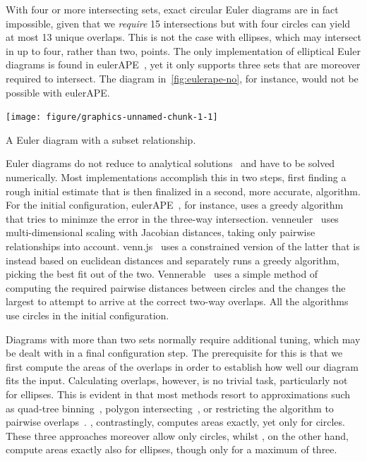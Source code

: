 \documentclass[
  oneside,
  openany,
  numbers=noendperiod,
  parskip=half,
  bibliography=totoc
]{scrbook}\usepackage[]{graphicx}\usepackage{xcolor}
\newenvironment{knitrout}{}{} %
\newcommand{\pkg}[1]{{\fontseries{b}\selectfont #1}}
\begin{document}
With four or more intersecting sets, exact circular Euler diagrams are in fact
impossible, given that we \emph{require} 15 intersections but with four circles
can yield at most 13 unique overlaps. This is not the case with ellipses, which
may intersect in up to four, rather than two, points. The only implementation of
elliptical Euler diagrams is found in \pkg{eulerAPE}~\citep{micallef_2014}, yet
it only supports three sets that are moreover required to intersect. The
diagram in~\cref{fig:eulerape-no}, for instance, would not be possible
with \pkg{eulerAPE}.

\begin{marginfigure}
\begin{knitrout}\small
{}\color{fgcolor}

{\centering \texttt{[image: figure/graphics-unnamed-chunk-1-1]} 

}



\end{knitrout}
\caption{A Euler diagram with a subset relationship.}
\label{fig:eulerape-no}
\end{marginfigure}

Euler diagrams do not reduce to analytical solutions~\citep{chow_2007} and have
to be solved numerically. Most implementations accomplish this in two steps,
first finding a rough initial estimate that is then finalized in a second, more
accurate, algorithm. For the initial configuration,
\pkg{eulerAPE}~\citep{micallef_2013}, for instance, uses a greedy algorithm that
tries to minimze the error in the three-way intersection.
\pkg{venneuler}~\citep{wilkinson_2012} uses multi-dimensional scaling with
Jacobian distances, taking only pairwise relationships into account.
\pkg{venn.js}~\citet{frederickson_2016} uses a constrained version of the latter
that is instead based on euclidean distances and separately runs a greedy
algorithm, picking the best fit out of the two.
\pkg{Vennerable}~\citet{swinton_2011} uses a simple method of computing the
required pairwise distances between circles and the changes the largest to
attempt to arrive at the correct two-way overlaps. All the algorithms use
circles in the initial configuration.

Diagrams with more than two sets normally require additional tuning, which may
be dealt with in a final configuration step. The prerequisite for this is that
we first compute the areas of the overlaps in order to establish how well our
diagram fits the input. Calculating overlaps, however, is no trivial task,
particularly not for ellipses. This is evident in that most methods resort to
approximations such as quad-tree binning~\citep{wilkinson_2012}, polygon
intersecting~\citep{kestler_2008}, or restricting the algorithm to pairwise
overlaps~\citep{swinton_2011}. \citet{frederickson_2016}, contrastingly,
computes areas exactly, yet only for circles. These three approaches moreover allow only
circles, whilst \citet{micallef_2013}, on the other hand, compute areas exactly
also for ellipses, though only for a maximum of three.
\end{document}
